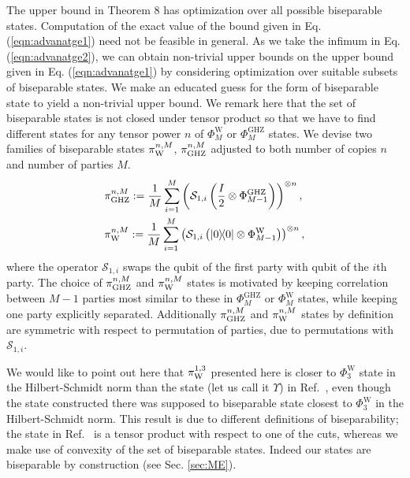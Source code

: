 \documentclass[aps,pra,twocolumn,superscriptaddress,longbibliography]{revtex4-1}
\begin{document}
The upper bound in Theorem 8 has optimization over all possible biseparable states. Computation of the exact value of the bound given in Eq. (\ref{eqn:advanatge1}) need not be feasible in general. As we take the infimum in Eq. (\ref{eqn:advanatge2}), we can obtain non-trivial upper bounds on the upper bound given in Eq. (\ref{eqn:advanatge1}) by considering optimization over suitable subsets of biseparable states. We make an educated guess for the form of biseparable state to yield a non-trivial upper bound. We remark here that the set of biseparable states is not closed under tensor product so that we have to find different states for any tensor power $n$ of $\Phi_M^\mathrm{W}$ or $\Phi_M^\mathrm{GHZ}$ states. We devise two families of biseparable states $\pi_\textnormal{W}^{n,M}$, $\pi_\textnormal{GHZ}^{n,M}$ adjusted to both number of copies $n$ and number of parties $M$.
\begin{align}
    &\pi_\textnormal{GHZ}^{n,M}:= \frac{1}{M}\sum_{i=1}^M \left ( \mathcal{S}_{1,i} \left( \frac{I}{2}\otimes \Phi_{M-1}^\mathrm{GHZ}\right)\right)^{\otimes n}, \label{eqn:bisepGHZ}\\
    &\pi_\textnormal{W}^{n,M}:= \frac{1}{M}\sum_{i=1}^M \left ( \mathcal{S}_{1,i} \left( \op{0}\otimes \Phi_{M-1}^\mathrm{W}\right)\right)^{\otimes n},\label{eqn:bisepW}
\end{align}
where the operator $\mathcal{S}_{1,i}$ swaps the qubit of the first party with qubit of the $i$th party. The choice of $\pi_\textnormal{GHZ}^{n,M}$ and $\pi_\textnormal{W}^{n,M}$ states is motivated by keeping correlation between $M-1$ parties most similar to these in $\Phi_M^\mathrm{GHZ}$ or $\Phi_M^\mathrm{W}$ states, while keeping one party explicitly separated. Additionally $\pi_\textnormal{GHZ}^{n,M}$ and $\pi_\textnormal{W}^{n,M}$ states by definition are symmetric with respect to permutation of parties, due to permutations with $\mathcal{S}_{1,i}$. 

We would like to point out here that $\pi_\textnormal{W}^{1,3}$ presented here is closer to $\Phi_{3}^\mathrm{W}$ state in the Hilbert-Schmidt norm than the state (let us call it $\Upsilon$) in Ref.~\cite{VDM-2002}, even though the state constructed there was supposed to biseparable state closest to $\Phi_{3}^\mathrm{W}$ in the Hilbert-Schmidt norm. This result is due to different definitions of biseparability; the state in Ref.~\cite{VDM-2002} is a tensor product with respect to one of the cuts, whereas we make use of convexity of the set of biseparable states. Indeed our states are biseparable by construction (see Sec. \ref{sec:ME}).
\end{document}
